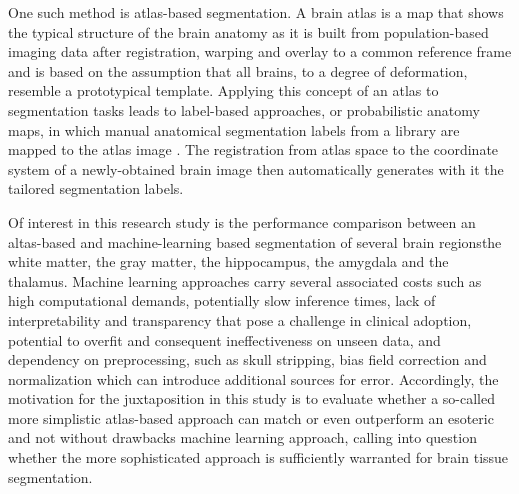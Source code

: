 One such method is atlas-based segmentation. A brain atlas is a map that shows the typical structure of the brain anatomy as it is built from population-based imaging data after registration, warping and overlay to a common reference frame and is based on the assumption that all brains, to a degree of deformation, resemble a prototypical template. Applying this concept of an atlas to segmentation tasks leads to label-based approaches, or probabilistic anatomy maps, in which manual anatomical segmentation labels from a library are mapped to the atlas image \cite{b7}. The registration from atlas space to the coordinate system of a newly-obtained brain image then automatically generates with it the tailored segmentation labels.

Of interest in this research study is the performance comparison between an altas-based and machine-learning based segmentation of several brain regions\textemdash{}the white matter, the gray matter, the hippocampus, the amygdala and the thalamus. Machine learning approaches carry several associated costs such as high computational demands, potentially slow inference times, lack of interpretability and transparency that pose a challenge in clinical adoption, potential to overfit and consequent ineffectiveness on unseen data, and dependency on preprocessing, such as skull stripping, bias field correction and normalization which can introduce additional sources for error. Accordingly, the motivation for the juxtaposition in this study is to evaluate whether a so-called more simplistic atlas-based approach can match or even outperform an esoteric and not without drawbacks machine learning approach, calling into question whether the more sophisticated approach is sufficiently warranted for brain tissue segmentation.



















